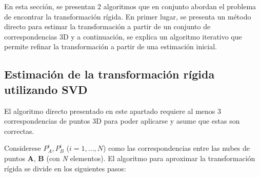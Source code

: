 En esta sección, se presentan 2 algoritmos que en conjunto abordan el problema de encontrar la transformación rígida. En primer lugar, se presenta un método directo para estimar la transformación a partir de un conjunto de correspondencias 3D y a continuación, se explica un algoritmo iterativo que permite refinar la transformación a partir de una estimación inicial.

\subsection{Estimación de la transformación rígida utilizando SVD}
El algoritmo directo presentado en este apartado requiere al menos 3 correspondencias de puntos 3D para poder aplicarse y asume que estas son correctas.

Considerese $P_{A}^{i}, P_{B}^{i}$ ($i=1,...,N$) como las correspondencias entre las nubes de puntos \textbf{A}, \textbf{B} (con \textsl{N} elementos).
El algoritmo para aproximar la transformación rígida se divide en los siguientes pasos:
